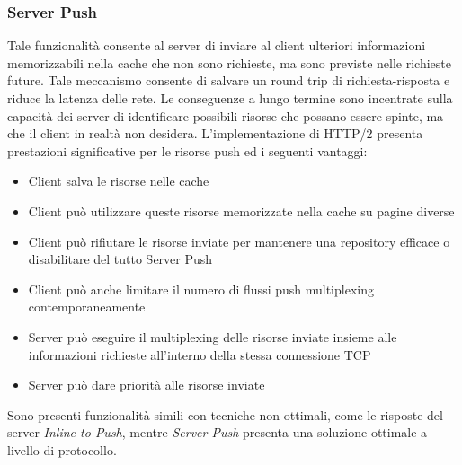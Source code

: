\documentclass[a4paper,11pt]{article}
\begin{document}
\subsubsection{Server Push}
Tale funzionalità consente al server di inviare al client ulteriori informazioni memorizzabili nella cache che non sono richieste, ma sono previste nelle richieste future.\newline
Tale meccanismo consente di salvare un round trip di richiesta-risposta e riduce la latenza delle rete. Le conseguenze a lungo termine sono incentrate sulla capacità dei server di identificare possibili risorse che possano essere spinte, ma che il client in realtà non desidera.\newline
L’implementazione di HTTP/2 presenta prestazioni significative per le risorse push ed i seguenti vantaggi:
\begin{itemize}
    \setlength{\itemindent}{2em}
    \item Client salva le risorse nelle cache
    \item Client può utilizzare queste risorse memorizzate nella cache su pagine diverse
    \item Client può rifiutare le risorse inviate per mantenere una repository efficace o disabilitare del tutto Server Push
    \item Client può anche limitare il numero di flussi push multiplexing contemporaneamente
    \item Server può eseguire il multiplexing delle risorse inviate insieme alle informazioni richieste all’interno della stessa connessione TCP
    \item Server può dare priorità alle risorse inviate
\end{itemize}
Sono presenti funzionalità simili con tecniche non ottimali, come le risposte del server \textit{Inline to Push}, mentre \textit{Server Push} presenta una soluzione ottimale a livello di protocollo.
\end{document}
